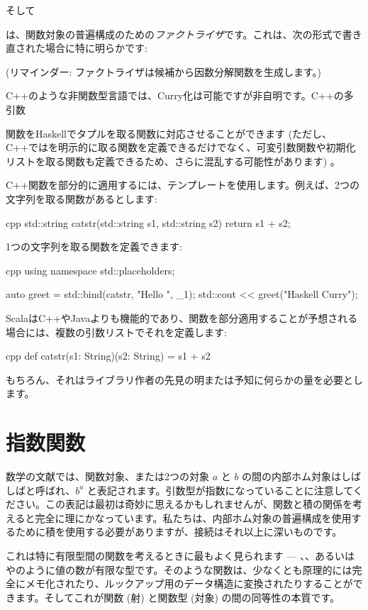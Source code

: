 そして

 は、関数対象の普遍構成のための\emph{ファクトライザ}です。これは、次の形式で書き直された場合に特に明らかです: 

 (リマインダー: ファクトライザは候補から因数分解関数を生成します。) 

C++のような非関数型言語では、Curry化は可能ですが非自明です。C++の多引数

関数をHaskellでタプルを取る関数に対応させることができます (ただし、C++ではを明示的に取る関数を定義できるだけでなく、可変引数関数や初期化リストを取る関数も定義できるため、さらに混乱する可能性があります) 。

C++関数を部分的に適用するには、テンプレートを使用します。例えば、2つの文字列を取る関数があるとします: 

\begin{snip}{cpp}
std::string catstr(std::string s1, std::string s2) {
    return s1 + s2;
}
\end{snip}
1つの文字列を取る関数を定義できます: 

\begin{snip}{cpp}
using namespace std::placeholders;

auto greet = std::bind(catstr, "Hello ", _1);
std::cout << greet("Haskell Curry");
\end{snip}
ScalaはC++やJavaよりも機能的であり、関数を部分適用することが予想される場合には、複数の引数リストでそれを定義します: 

\begin{snip}{cpp}
def catstr(s1: String)(s2: String) = s1 + s2
\end{snip}
もちろん、それはライブラリ作者の先見の明または予知に何らかの量を必要とします。

\section{指数関数}

数学の文献では、関数対象、または2つの対象 $a$ と $b$ の間の内部ホム対象はしばしばと呼ばれ、$b^{a}$ と表記されます。引数型が指数になっていることに注意してください。この表記は最初は奇妙に思えるかもしれませんが、関数と積の関係を考えると完全に理にかなっています。私たちは、内部ホム対象の普遍構成を使用するために積を使用する必要がありますが、接続はそれ以上に深いものです。

これは特に有限型間の関数を考えるときに最もよく見られます --- 、、あるいはやのように値の数が有限な型です。そのような関数は、少なくとも原理的には完全にメモ化されたり、ルックアップ用のデータ構造に変換されたりすることができます。そしてこれが関数 (射) と関数型 (対象) の間の同等性の本質です。

